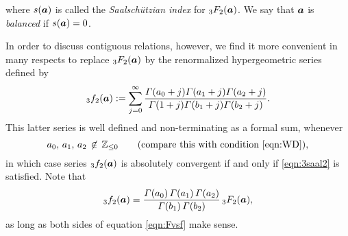\documentclass[a4paper,12pt]{article}
\theoremstyle{plain}
\def\Z{\mathbb{Z}}
\def\vG{\varGamma}
\def\ba{\mbox{\boldmath $a$}}
\begin{document}
where $s(\ba)$ is called the {\sl Saalsch\"{u}tzian index} for ${}_3F_2(\ba)$.  
We say that $\ba$ is {\sl balanced} if $s(\ba) = 0$.  
\par
In order to discuss contiguous relations, however, we find it more convenient 
in many respects to replace ${}_3F_2(\ba)$ by the renormalized 
hypergeometric series defined by 
\begin{equation*} 
{}_3f_2(\ba) := \sum_{j=0}^{\infty} 
\dfrac{\vG(a_0+j) \vG(a_1+j) \vG(a_2+j) }{\vG(1+j) \vG(b_1+j) \vG(b_2+j)}.     
\end{equation*}
This latter series is well defined and non-terminating as a formal sum, 
whenever 
\begin{equation*}
a_0, \, a_1, \, a_2 \, \not\in \, \Z_{\le 0} \qquad 
\mbox{(compare this with condition \eqref{eqn:WD})}, 
\end{equation*}
in which case series ${}_3f_2(\ba)$ is absolutely convergent 
if and only if \eqref{eqn:3saal2} is satisfied. 
Note that   
\begin{equation} \label{eqn:Fvsf}
{}_3f_2(\ba) 
= \dfrac{\vG( a_0 ) \, \vG( a_1 ) \, \vG( a_2 )}{\vG( b_1 ) \, \vG( b_2 )} 
\, {}_3F_2(\ba),  
\end{equation} 
as long as both sides of equation \eqref{eqn:Fvsf} make sense.  
\end{document}
